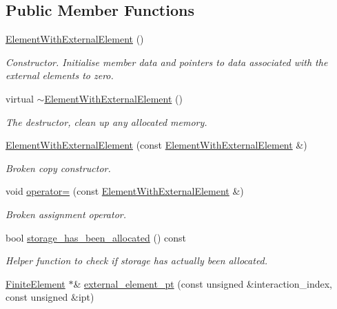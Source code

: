 \subsection*{Public Member Functions}
\begin{DoxyCompactItemize}
\item 
\hyperlink{classoomph_1_1ElementWithExternalElement_aee130ce977f3559845ce7860cb0c0f0e}{Element\+With\+External\+Element} ()
\begin{DoxyCompactList}\small\item\em Constructor. Initialise member data and pointers to data associated with the external elements to zero. \end{DoxyCompactList}\item 
virtual \hyperlink{classoomph_1_1ElementWithExternalElement_a50c9f65653e46d6e018b31c0d941d391}{$\sim$\+Element\+With\+External\+Element} ()
\begin{DoxyCompactList}\small\item\em The destructor, clean up any allocated memory. \end{DoxyCompactList}\item 
\hyperlink{classoomph_1_1ElementWithExternalElement_ae92f669fb0c1c4d416fde763818eac0b}{Element\+With\+External\+Element} (const \hyperlink{classoomph_1_1ElementWithExternalElement}{Element\+With\+External\+Element} \&)
\begin{DoxyCompactList}\small\item\em Broken copy constructor. \end{DoxyCompactList}\item 
void \hyperlink{classoomph_1_1ElementWithExternalElement_a2062e7f53cd53e6524658f5081eb211b}{operator=} (const \hyperlink{classoomph_1_1ElementWithExternalElement}{Element\+With\+External\+Element} \&)
\begin{DoxyCompactList}\small\item\em Broken assignment operator. \end{DoxyCompactList}\item 
bool \hyperlink{classoomph_1_1ElementWithExternalElement_a14f33794f4ca25faad844a8b061ae164}{storage\+\_\+has\+\_\+been\+\_\+allocated} () const
\begin{DoxyCompactList}\small\item\em Helper function to check if storage has actually been allocated. \end{DoxyCompactList}\item 
\hyperlink{classoomph_1_1FiniteElement}{Finite\+Element} $\ast$\& \hyperlink{classoomph_1_1ElementWithExternalElement_a30c8347cfed1bb9d4ebc500f705bc739}{external\+\_\+element\+\_\+pt} (const unsigned \&interaction\+\_\+index, const unsigned \&ipt)

\end{DoxyCompactItemize}
